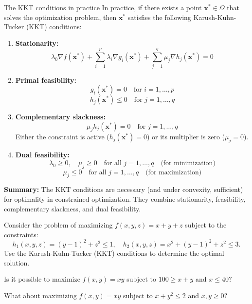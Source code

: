 \documentclass[c]{beamer}
\begin{document}
\begin{frame}[allowframebreaks]{The KKT conditions in practice}
  In practice, if there exists a point $\mathbf{x}^* \in \Omega$ that solves the optimization problem, then $\mathbf{x}^*$ satisfies the following Karush-Kuhn-Tucker (KKT) conditions:

  \begin{enumerate}
    \item \textbf{Stationarity:}
    \[
      \lambda_0 \nabla f(\mathbf{x}^*) + \sum_{i=1}^p \lambda_i \nabla g_i(\mathbf{x}^*) + \sum_{j=1}^q \mu_j \nabla h_j(\mathbf{x}^*) = 0
    \]
    \item \textbf{Primal feasibility:}
    \[
      g_i(\mathbf{x}^*) = 0 \quad \text{for } i = 1, \ldots, p
    \]
    \[
      h_j(\mathbf{x}^*) \leq 0 \quad \text{for } j = 1, \ldots, q
    \]
\framebreak

    \item \textbf{Complementary slackness:}
    \[
      \mu_j h_j(\mathbf{x}^*) = 0 \quad \text{for } j = 1, \ldots, q
    \]
    Either the constraint is active ($h_j(\mathbf{x}^*) = 0$) or its multiplier is zero ($\mu_j = 0$).
    \item \textbf{Dual feasibility:}
    \[
      \lambda_0 \geq 0, \quad \mu_j \geq 0 \quad \text{for all } j = 1, \ldots, q \quad \text{(for minimization)}
    \]
    \[
      \mu_j \leq 0 \quad \text{for all } j = 1, \ldots, q \quad \text{(for maximization)}
    \]
  \end{enumerate}

  \textbf{Summary:}  
  The KKT conditions are necessary (and under convexity, sufficient) for optimality in constrained optimization. They combine stationarity, feasibility, complementary slackness, and dual feasibility.

\end{frame}
\begin{frame}
\begin{Exercise}
  Consider the problem of maximizing $f(x, y, z) = x + y + z$ subject to the constraints:
  \[
    h_1(x, y, z) = (y - 1)^2 + z^2 \leq 1,
    \quad
    h_2(x, y, z) = x^2 + (y - 1)^2 + z^2 \leq 3.
  \]
  Use the Karush-Kuhn-Tucker (KKT) conditions to determine the optimal solution.
\end{Exercise}
\begin{Exercise}
  Is it possible to maximize $f(x,y)=xy$ subject to $100 \geq x+y$ and $x\leq 40$?
\end{Exercise}
\begin{Exercise}
  What about maximizing $f(x,y)=xy$ subject to $x+y^2\leq 2$ and $x,y \geq 0$?
\end{Exercise}
\end{frame}



\end{document}
